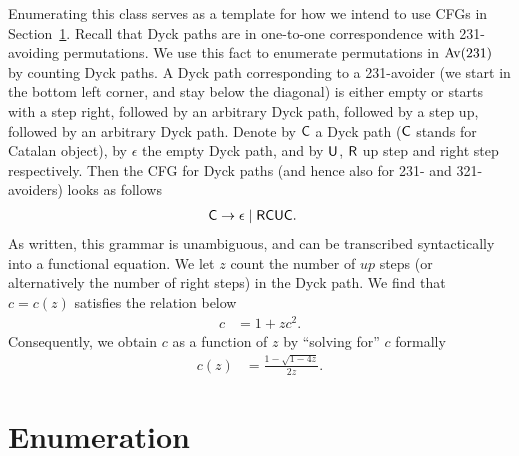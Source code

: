 \begin{example}[Enumerating $\Av(231)$]
Enumerating this class serves as a template for how we intend to use CFGs in Section~\ref{sec:enum}. Recall that Dyck paths are in one-to-one correspondence with 231-avoiding permutations. We use this fact to enumerate permutations in $\Av(231)$ by counting Dyck paths. A Dyck path corresponding to a 231-avoider (we start in the bottom left corner, and stay below the diagonal) is either empty or starts with a step right, followed by an arbitrary Dyck path, followed by a step up, followed by an arbitrary Dyck path. Denote by $\mathsf{C}$ a Dyck path ($\mathsf{C}$ stands for Catalan object), by $\epsilon$ the empty Dyck path, and by $\mathsf{U}$, $\mathsf{R}$ up step and right step respectively. Then the CFG for Dyck paths (and hence also for 231- and 321-avoiders) looks as follows
\begin{align*}
\mathsf{C} &\to \epsilon \mid \mathsf{R}\mathsf{C}\mathsf{U}\mathsf{C}.
\end{align*}
\noindent As written, this grammar is unambiguous, and can be transcribed syntactically into a functional equation. We let $z$ count the number of $up$ steps (or alternatively the number of right steps) in the Dyck path. We find that $c = c(z)$ satisfies the relation below 
\begin{align*}
c &= 1 + zc^2.
\end{align*}
\noindent Consequently, we obtain $c$ as a function of $z$ by ``solving for'' $c$ formally
\begin{align*}
c(z) &= \frac{1 -\sqrt{1-4z}}{2z}.
\end{align*}
\end{example}

\section{Enumeration}
\label{sec:enum}


